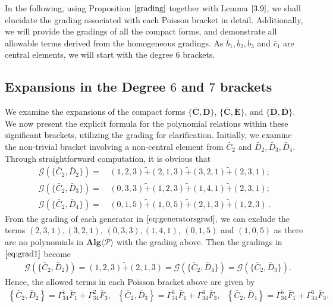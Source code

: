 \documentclass[10pt]{amsart}
\theoremstyle{definition}
\theoremstyle{corollary}
\theoremstyle{remark}
\theoremstyle{conclusion}
\begin{document}
 In the following, using Proposition $\ref{grading}$ together with Lemma $\ref{3.9}$, we shall elucidate the grading associated with each Poisson bracket in detail. Additionally, we will provide the gradings of all the compact forms, and demonstrate all allowable terms derived from the homogeneous gradings. As $\bar{b}_1,\bar{b}_2, \bar{b}_3$ and $\bar{c}_1$ are central elements, we will start with the degree $6$ brackets.

\vskip 0.5cm
\subsection{Expansions in the Degree $6$ and $7$ brackets}

\label{subsec4.2}

We examine the expansions of the compact forms $\{\bar{\textbf{C}},\bar{\textbf{D}}\}$, $\{\bar{\textbf{C}},\bar{\textbf{E}}\}$, and $\{\bar{\textbf{D}},\bar{\textbf{D}}\} $. We now present the explicit formula for the polynomial relations within these significant brackets, utilizing the grading for clarification. Initially, we examine the non-trivial bracket involving a non-central element from  $\bar{C}_2$ and  $\bar{D}_2,\bar{D}_3,\bar{D}_4$. Through straightforward computation, it is obvious that 
\begin{align}
    \mathcal{G} \left(\{\bar{C}_2,\bar{D}_2\}\right) = &\, (1,2,3) \tilde{+}(2,1,3) \tilde{+}   (3,2,1)  
      \tilde{+}    (2,3,1)    ; \nonumber  \\
    \mathcal{G} \left(\{\bar{C}_2,\bar{D}_3\}\right) = &\,  (0,3,3) \tilde{+}(1,2,3) \tilde{+}   
         (1,4,1) \tilde{+} (2,3,1) ;  \label{eq:grad1}  \\
    \mathcal{G} \left(\{\bar{C}_2,\bar{D}_4\}\right) = &\,  (0,1,5) \tilde{+}(1,0,5) \tilde{+} 
     (2,1,3)   \tilde{+}
         (1,2,3)  \, . \nonumber
\end{align} 
From the grading of each generator in $\eqref{eq:generatorsgrad},$ we can exclude the terms $(2,3,1), (3,2,1)$, $ (0,3,3), (1,4,1)$, $(0,1,5)$ and $(1,0,5)$ as there are no polynomials in $\textbf{Alg} \langle \mathcal{P}\rangle$ with the grading above. Then the gradings in $\eqref{eq:grad1}$ become 
\begin{align*}
    &\mathcal{G}  \left(\{\bar{C}_2,\bar{D}_2\}\right) =    (1,2,3) \tilde{+}(2,1,3) = \mathcal{G}  \left(\{\bar{C}_2,\bar{D}_4\}\right) =
    \mathcal{G}  \left(\{\bar{C}_2,\bar{D}_3\}\right) . 
\end{align*} 
Hence, the allowed terms in each Poisson bracket above are given by \begin{align}
    \left\{\bar{C}_2,\bar{D}_2\right\} = \Gamma_{34}^1 \bar{F}_1 + \Gamma_{34}^2 \bar{F}_3, \text{ }  \left\{\bar{C}_2,\bar{D}_3\right\} =     \Gamma_{34}^3 \bar{F}_1 + \Gamma_{34}^4\bar{F}_3   
    , \text{ } \left\{\bar{C}_2,\bar{D}_4\right\} =      \Gamma_{34}^5 \bar{F}_1  + \Gamma_{34}^6\bar{F}_3 . \label{eq:expect} 
\end{align} 
\end{document}
